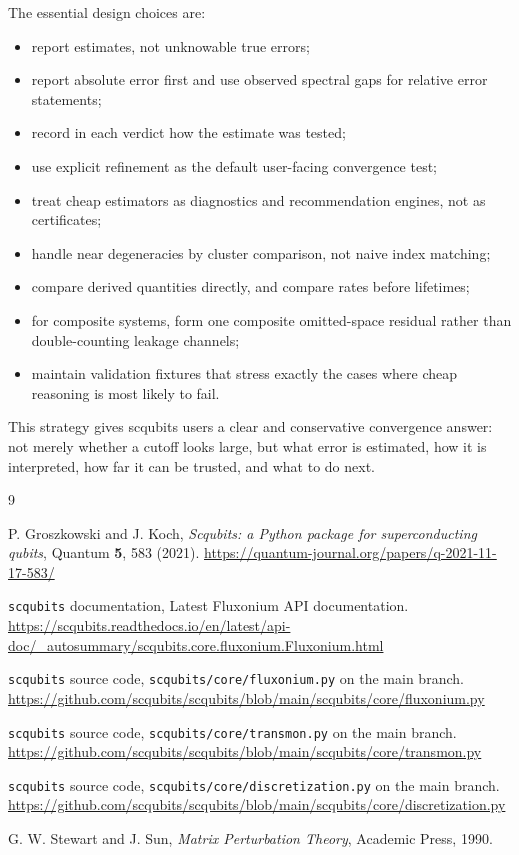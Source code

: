 \documentclass[11pt,a4paper]{article}
\begin{document}
The essential design choices are:
\begin{itemize}
\item report estimates, not unknowable true errors;
\item report absolute error first and use observed spectral gaps for relative error statements;
\item record in each verdict how the estimate was tested;
\item use explicit refinement as the default user-facing convergence test;
\item treat cheap estimators as diagnostics and recommendation engines, not as certificates;
\item handle near degeneracies by cluster comparison, not naive index matching;
\item compare derived quantities directly, and compare rates before lifetimes;
\item for composite systems, form one composite omitted-space residual rather than double-counting leakage channels;
\item maintain validation fixtures that stress exactly the cases where cheap reasoning is most likely to fail.
\end{itemize}

This strategy gives scqubits users a clear and conservative convergence answer: not merely whether a cutoff looks large, but what error is estimated, how it is interpreted, how far it can be trusted, and what to do next.

\begin{thebibliography}{9}

P. Groszkowski and J. Koch,
\newblock \emph{Scqubits: a Python package for superconducting qubits},
\newblock Quantum \textbf{5}, 583 (2021).
\newblock \url{https://quantum-journal.org/papers/q-2021-11-17-583/}

\texttt{scqubits} documentation,
\newblock Latest Fluxonium API documentation.
\newblock \url{https://scqubits.readthedocs.io/en/latest/api-doc/_autosummary/scqubits.core.fluxonium.Fluxonium.html}

\texttt{scqubits} source code,
\newblock \texttt{scqubits/core/fluxonium.py} on the main branch.
\newblock \url{https://github.com/scqubits/scqubits/blob/main/scqubits/core/fluxonium.py}

\texttt{scqubits} source code,
\newblock \texttt{scqubits/core/transmon.py} on the main branch.
\newblock \url{https://github.com/scqubits/scqubits/blob/main/scqubits/core/transmon.py}

\texttt{scqubits} source code,
\newblock \texttt{scqubits/core/discretization.py} on the main branch.
\newblock \url{https://github.com/scqubits/scqubits/blob/main/scqubits/core/discretization.py}

G. W. Stewart and J. Sun,
\newblock \emph{Matrix Perturbation Theory},
\newblock Academic Press, 1990.

\end{thebibliography}
\end{document}
